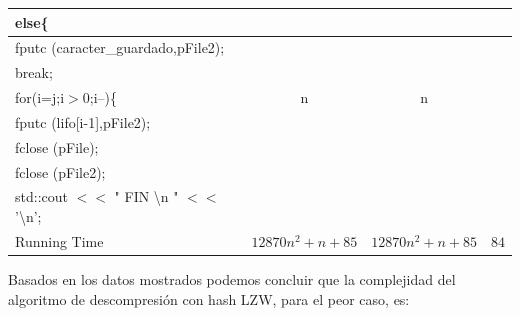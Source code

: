 \documentclass[letterpaper]{article}
\begin{document}
{\begin{tabular}{|l|c|c|c|}
\hline
\parbox{297pt}{\raggedright 
\hspace{2cm} else\{
} & \parbox{45pt}{} & \parbox{24pt}{} & \parbox{17pt}{} \\
\hline
\parbox{297pt}{\raggedright 
\hspace{2.5cm} fputc (caracter\_guardado,pFile2);
} & \parbox{45pt}{} & \parbox{24pt}{} & \parbox{17pt}{} \\
\hline
\parbox{297pt}{\raggedright 
\hspace{2.5cm} break;
} & \parbox{45pt}{} & \parbox{24pt}{} & \parbox{17pt}{} \\


\hline
\parbox{297pt}{\raggedright 
\hspace{1.5cm} for(i=j;i$>$0;i--)\{
} & \parbox{45pt}{\centering n} & \parbox{24pt}{\centering n} & \parbox{17pt}{} \\
\hline
\parbox{297pt}{\raggedright 
\hspace{2cm} fputc (lifo[i-1],pFile2);
} & \parbox{45pt}{} & \parbox{24pt}{} & \parbox{17pt}{} \\

\hline
\parbox{297pt}{\raggedright 
\hspace{1cm} fclose (pFile);
} & \parbox{45pt}{} & \parbox{24pt}{} & \parbox{17pt}{} \\
\hline
\parbox{297pt}{\raggedright 
\hspace{1cm} fclose (pFile2);
} & \parbox{45pt}{} & \parbox{24pt}{} & \parbox{17pt}{} \\

\hline
\parbox{297pt}{\raggedright 
\hspace{0.5cm} std::cout $<<$ " FIN \textbackslash n " $<<$ '\textbackslash n';
} & \parbox{45pt}{} & \parbox{24pt}{} & \parbox{17pt}{} \\

\hline
\parbox{297pt}{\raggedright Running Time
} & \parbox{45pt}{\centering $12870n^2 + n + 85 $} & \parbox{24pt}{\centering $ 12870n^2 + n + 85 $} & \parbox{17pt}{\centering $84$} \\
\hline
\end{tabular}
\vspace{2pt}

}
Basados en los datos mostrados podemos concluir que la complejidad del algoritmo de descompresión con hash LZW, para el peor caso, es:
\end{document}
